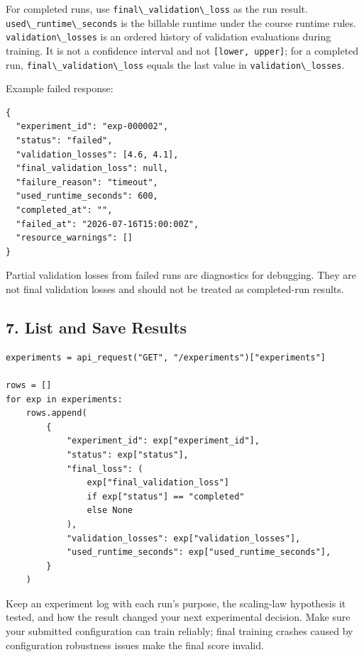 \documentclass[
]{article}
\newcommand{\passthrough}[1]{#1}
\begin{document}
For completed runs, use
\passthrough{\lstinline!final\_validation\_loss!} as the run result.
\passthrough{\lstinline!used\_runtime\_seconds!} is the billable runtime
under the course runtime rules.
\passthrough{\lstinline!validation\_losses!} is an ordered history of
validation evaluations during training. It is not a confidence interval
and not \passthrough{\lstinline![lower, upper]!}; for a completed run,
\passthrough{\lstinline!final\_validation\_loss!} equals the last value
in \passthrough{\lstinline!validation\_losses!}.

Example failed response:

\begin{verbatim}
{
  "experiment_id": "exp-000002",
  "status": "failed",
  "validation_losses": [4.6, 4.1],
  "final_validation_loss": null,
  "failure_reason": "timeout",
  "used_runtime_seconds": 600,
  "completed_at": "",
  "failed_at": "2026-07-16T15:00:00Z",
  "resource_warnings": []
}
\end{verbatim}

Partial validation losses from failed runs are diagnostics for
debugging. They are not final validation losses and should not be
treated as completed-run results.

\hypertarget{list-and-save-results}{%
\subsection{7. List and Save Results}\label{list-and-save-results}}

\begin{verbatim}
experiments = api_request("GET", "/experiments")["experiments"]

rows = []
for exp in experiments:
    rows.append(
        {
            "experiment_id": exp["experiment_id"],
            "status": exp["status"],
            "final_loss": (
                exp["final_validation_loss"]
                if exp["status"] == "completed"
                else None
            ),
            "validation_losses": exp["validation_losses"],
            "used_runtime_seconds": exp["used_runtime_seconds"],
        }
    )
\end{verbatim}

Keep an experiment log with each run's purpose, the scaling-law
hypothesis it tested, and how the result changed your next experimental
decision. Make sure your submitted configuration can train reliably;
final training crashes caused by configuration robustness issues make
the final score invalid.
\end{document}
